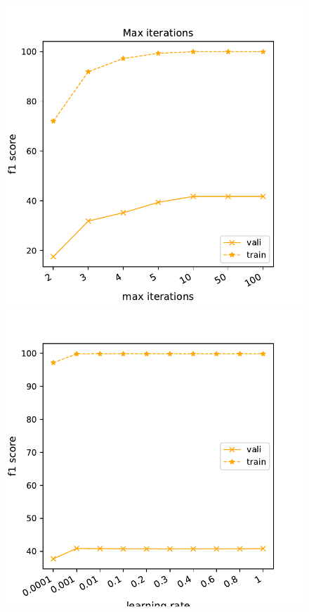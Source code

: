 \documentclass[11pt]{article}
\begin{document}
\begin{figure}[t]
\begin{minipage}[t]{0.33\textwidth}
\end{minipage}
\begin{minipage}[t]{0.33\textwidth}
\includegraphics[width=1\linewidth]{amazon/Per_max_iterations_2.pdf}
\end{minipage}
\begin{minipage}[t]{0.33\textwidth}
\includegraphics[width=1\linewidth]{amazon/Per_learning_rate2.pdf}

\end{minipage}
\end{figure}
\end{document}
